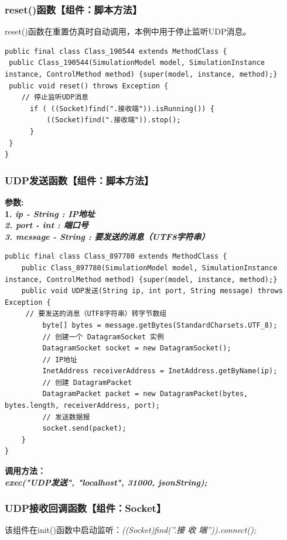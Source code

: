 \subsubsection{reset()函数【组件：脚本方法】}
reset()函数在重置仿真时自动调用，本例中用于停止监听UDP消息。
\begin{lstlisting}
public final class Class_190544 extends MethodClass {
 public Class_190544(SimulationModel model, SimulationInstance instance, ControlMethod method) {super(model, instance, method);}
 public void reset() throws Exception {
    // 停止监听UDP消息
      if ( ((Socket)find(".接收端")).isRunning()) {
          ((Socket)find(".接收端")).stop();
      }
 }
}
\end{lstlisting}\vspace{-30pt}
\subsubsection{UDP发送函数【组件：脚本方法】}
\noindent\bf{参数}:\\
1. \it{ip} - String : IP地址\\
2. \it{port} - int : 端口号\\
3. \it{message} - String : 要发送的消息（UTF8字符串）
\begin{lstlisting}
public final class Class_897780 extends MethodClass {
    public Class_897780(SimulationModel model, SimulationInstance instance, ControlMethod method) {super(model, instance, method);}
    public void UDP发送(String ip, int port, String message) throws Exception {
     // 要发送的消息（UTF8字符串）转字节数组
         byte[] bytes = message.getBytes(StandardCharsets.UTF_8);
         // 创建一个 DatagramSocket 实例
         DatagramSocket socket = new DatagramSocket();
         // IP地址
         InetAddress receiverAddress = InetAddress.getByName(ip);
         // 创建 DatagramPacket
         DatagramPacket packet = new DatagramPacket(bytes, bytes.length, receiverAddress, port);
         // 发送数据报
         socket.send(packet);
    }
}
\end{lstlisting}\vspace{-30pt}
\noindent\bf{调用方法}：\\
\it{exec("UDP发送", "localhost", 31000, jsonString);}

\subsubsection{UDP接收回调函数【组件：Socket】}
该组件在init()函数中启动监听：\it{((Socket)find(”.接 收 端”)).connect();}

